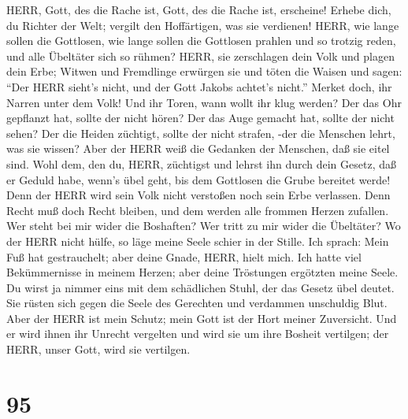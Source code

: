  HERR, Gott, des die Rache ist, Gott, des die Rache ist,
erscheine!  Erhebe dich, du Richter der Welt; vergilt den
Hoffärtigen, was sie verdienen!  HERR, wie lange sollen die
Gottlosen, wie lange sollen die Gottlosen prahlen  und so
trotzig reden, und alle Übeltäter sich so rühmen?  HERR, sie
zerschlagen dein Volk und plagen dein Erbe;  Witwen und
Fremdlinge erwürgen sie und töten die Waisen  und sagen:
``Der HERR sieht's nicht, und der Gott Jakobs achtet's nicht.''
 Merket doch, ihr Narren unter dem Volk! Und ihr Toren, wann
wollt ihr klug werden?  Der das Ohr gepflanzt hat, sollte
der nicht hören? Der das Auge gemacht hat, sollte der nicht sehen?
 Der die Heiden züchtigt, sollte der nicht strafen, -der
die Menschen lehrt, was sie wissen?  Aber der HERR weiß die
Gedanken der Menschen, daß sie eitel sind.  Wohl dem, den
du, HERR, züchtigst und lehrst ihn durch dein Gesetz,  daß
er Geduld habe, wenn's übel geht, bis dem Gottlosen die Grube bereitet
werde!  Denn der HERR wird sein Volk nicht verstoßen noch
sein Erbe verlassen.  Denn Recht muß doch Recht bleiben,
und dem werden alle frommen Herzen zufallen.  Wer steht bei
mir wider die Boshaften? Wer tritt zu mir wider die Übeltäter?
 Wo der HERR nicht hülfe, so läge meine Seele schier in der
Stille.  Ich sprach: Mein Fuß hat gestrauchelt; aber deine
Gnade, HERR, hielt mich.  Ich hatte viel Bekümmernisse in
meinem Herzen; aber deine Tröstungen ergötzten meine Seele.
 Du wirst ja nimmer eins mit dem schädlichen Stuhl, der das
Gesetz übel deutet.  Sie rüsten sich gegen die Seele des
Gerechten und verdammen unschuldig Blut.  Aber der HERR ist
mein Schutz; mein Gott ist der Hort meiner Zuversicht.  Und
er wird ihnen ihr Unrecht vergelten und wird sie um ihre Bosheit
vertilgen; der HERR, unser Gott, wird sie vertilgen.

\hypertarget{section-94}{%
\section{95}\label{section-94}}

